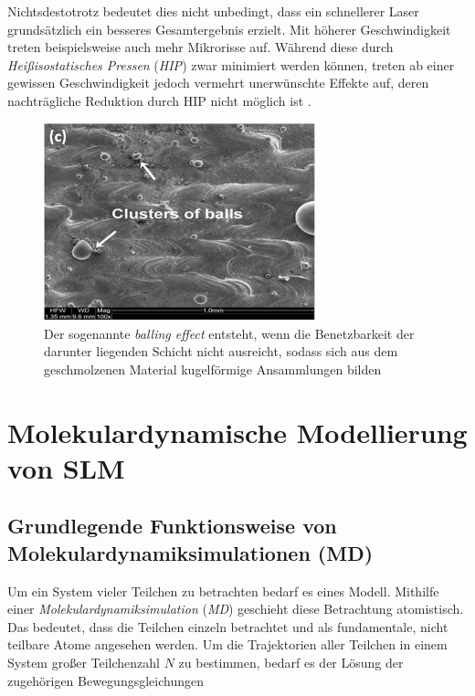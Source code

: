		Nichtsdestotrotz bedeutet dies nicht unbedingt, dass ein schnellerer Laser grundsätzlich
		ein besseres Gesamtergebnis erzielt. Mit höherer Geschwindigkeit treten beispielsweise
		auch mehr Mikrorisse auf. Während diese durch \emph{Heißisostatisches Pressen}
		(\emph{HIP}) zwar minimiert werden können, treten ab einer gewissen Geschwindigkeit jedoch
		vermehrt unerwünschte Effekte auf, deren nachträgliche Reduktion durch HIP nicht möglich
		ist \cite{sadali2020influence}.

		\begin{figure}[!ht]
			\centering
			\includegraphics[width=0.7\textwidth]{chapter/main/theory/img/defects/balling.png}
			\caption{Der sogenannte \emph{balling effect} entsteht, wenn die Benetzbarkeit der
			darunter liegenden Schicht nicht ausreicht, sodass sich aus dem geschmolzenen
			Material kugelförmige Ansammlungen bilden \cite{eskandarisabzi2019defect}}
			\label{fig:defects_balling}
		\end{figure}


\section{Molekulardynamische Modellierung von SLM}
	\subsection{Grundlegende Funktionsweise von Molekulardynamiksimulationen (MD)}
		Um ein System vieler Teilchen zu betrachten bedarf es eines Modell. Mithilfe einer
		\emph{Molekulardynamiksimulation} (\emph{MD}) geschieht diese Betrachtung atomistisch.
		Das bedeutet, dass die Teilchen einzeln betrachtet und als fundamentale, nicht teilbare
		Atome angesehen werden. Um die Trajektorien aller Teilchen in einem System großer
		Teilchenzahl $N$ zu bestimmen, bedarf es der Lösung der zugehörigen Bewegungsgleichungen

